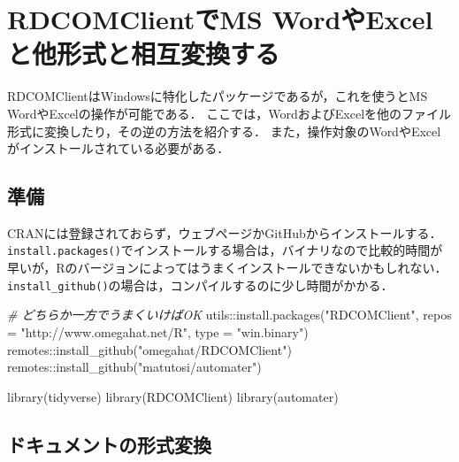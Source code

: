 \documentclass[
]{article}
\newenvironment{Shaded}{\begin{snugshade}}{\end{snugshade}}
\newcommand{\AttributeTok}[1]{\textcolor[rgb]{0.77,0.63,0.00}{#1}}
\newcommand{\CommentTok}[1]{\textcolor[rgb]{0.56,0.35,0.01}{\textit{#1}}}
\newcommand{\FunctionTok}[1]{\textcolor[rgb]{0.00,0.00,0.00}{#1}}
\newcommand{\NormalTok}[1]{#1}
\newcommand{\SpecialCharTok}[1]{\textcolor[rgb]{0.00,0.00,0.00}{#1}}
\newcommand{\StringTok}[1]{\textcolor[rgb]{0.31,0.60,0.02}{#1}}
\begin{document}
\hypertarget{RDCOMClient}{%
\section{RDCOMClientでMS WordやExcelと他形式と相互変換する}\label{RDCOMClient}}

RDCOMClientはWindowsに特化したパッケージであるが，これを使うとMS WordやExcelの操作が可能である．
ここでは，WordおよびExcelを他のファイル形式に変換したり，その逆の方法を紹介する．
また，操作対象のWordやExcelがインストールされている必要がある．

\hypertarget{ux6e96ux5099-15}{%
\subsection{準備}\label{ux6e96ux5099-15}}

CRANには登録されておらず，ウェブページかGitHubからインストールする．
\texttt{install.packages()}でインストールする場合は，バイナリなので比較的時間が早いが，Rのバージョンによってはうまくインストールできないかもしれない．
\texttt{install\_github()}の場合は，コンパイルするのに少し時間がかかる．

\begin{Shaded}
\begin{Highlighting}[]
  \CommentTok{\# どちらか一方でうまくいけばOK}
\NormalTok{utils}\SpecialCharTok{::}\FunctionTok{install.packages}\NormalTok{(}\StringTok{"RDCOMClient"}\NormalTok{, }\AttributeTok{repos =} \StringTok{"http://www.omegahat.net/R"}\NormalTok{, }\AttributeTok{type =} \StringTok{"win.binary"}\NormalTok{)}
\NormalTok{remotes}\SpecialCharTok{::}\FunctionTok{install\_github}\NormalTok{(}\StringTok{"omegahat/RDCOMClient"}\NormalTok{)}
\NormalTok{remotes}\SpecialCharTok{::}\FunctionTok{install\_github}\NormalTok{(}\StringTok{"matutosi/automater"}\NormalTok{)}
\end{Highlighting}
\end{Shaded}

\begin{Shaded}
\begin{Highlighting}[]
\FunctionTok{library}\NormalTok{(tidyverse)}
\FunctionTok{library}\NormalTok{(RDCOMClient)}
\FunctionTok{library}\NormalTok{(automater)}
\end{Highlighting}
\end{Shaded}

\hypertarget{ux30c9ux30adux30e5ux30e1ux30f3ux30c8ux306eux5f62ux5f0fux5909ux63db}{%
\subsection{ドキュメントの形式変換}\label{ux30c9ux30adux30e5ux30e1ux30f3ux30c8ux306eux5f62ux5f0fux5909ux63db}}
\end{document}
